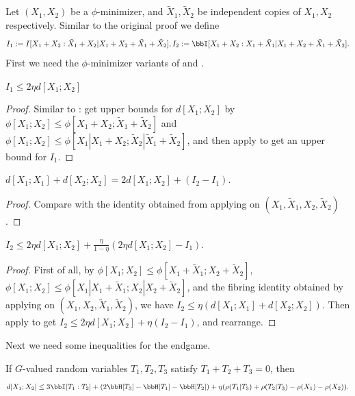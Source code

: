 Let $(X_1, X_2)$ be a $\phi$-minimizer, and $\tilde X_1, \tilde X_2$ be independent copies of $X_1,X_2$ respectively.
Similar to the original proof we define
$$ I_1 :=  I [X_1+X_2 : \tilde X_1 + X_2 | X_1+X_2+\tilde X_1+\tilde X_2], I_2 := \bbI[X_1+X_2 : X_1 + \tilde X_1 | X_1+X_2+\tilde X_1+\tilde X_2].$$
First we need the $\phi$-minimizer variants of  and .

\begin{lemma}\label{phi-first-estimate}\leanok
$I_1\le 2\eta d[X_1;X_2]$
\end{lemma}

\begin{proof}\leanok
Similar to : get upper bounds for $d[X_1;X_2]$ by $\phi[X_1;X_2]\le \phi[X_1+X_2;\tilde X_1+\tilde X_2]$ and $\phi[X_1;X_2]\le \phi[X_1|X_1+X_2;\tilde X_2|\tilde X_1+\tilde X_2]$, and then apply  to get an upper bound for $I_1$.
\end{proof}

\begin{lemma}\label{I1-I2-diff}\leanok
  $d[X_1;X_1]+d[X_2;X_2]= 2d[X_1;X_2]+(I_2-I_1)$.
\end{lemma}
\begin{proof}\leanok
Compare  with the identity obtained from applying  on $(X_1,\tilde X_1, X_2, \tilde X_2)$.
\end{proof}

\begin{lemma}\label{phi-second-estimate}\leanok
$I_2\le 2\eta d[X_1;X_2] + \frac{\eta}{1-\eta}(2\eta d[X_1;X_2]-I_1)$.
\end{lemma}

\begin{proof}\leanok
First of all, by $\phi[X_1;X_2]\le \phi[X_1+\tilde X_1;X_2+\tilde X_2]$, $\phi[X_1;X_2]\le \phi[X_1|X_1+\tilde X_1;X_2|X_2+\tilde X_2]$, and the fibring identity obtained by applying  on $(X_1,X_2,\tilde X_1,\tilde X_2)$,
we have $I_2\le \eta (d[X_1;X_1]+d[X_2;X_2])$. Then apply  to get $I_2\le 2\eta d[X_1;X_2] +\eta(I_2-I_1)$, and rearrange.
\end{proof}


Next we need some inequalities for the endgame.

\begin{lemma}\label{rho-BSG-triplet}\leanok
  If $G$-valued random variables $T_1,T_2,T_3$ satisfy $T_1+T_2+T_3=0$, then
  $$d[X_1;X_2]\le 3\bbI[T_1:T_2] + (2\bbH[T_3]-\bbH[T_1]-\bbH[T_2])+ \eta(\rho(T_1|T_3)+\rho(T_2|T_3)-\rho(X_1)-\rho(X_2)).$$
\end{lemma}

